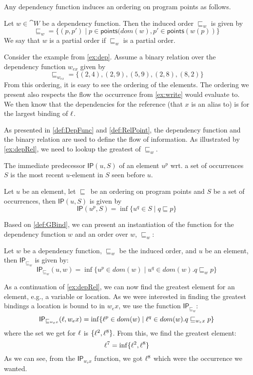 \documentclass{llncs}
\newcommand{\sqleq}{\ensuremath{\sqsubseteq\xspace}}
\newcommand{\points}{\ensuremath{\textsf{points}}}
\newcommand{\IP}{\ensuremath{\textsf{IP}}\xspace}
\begin{document}
Any dependency function induces an ordering on program points as follows.

\begin{definition}\label{def:RelPoint}
	Let $w\in\cat{W}$ be a dependency function.
	Then the induced order $\sqleq_w$ is given by
	 \[ \sqleq_w= \{(p,p')\mid p \in \points(dom(w), p' \in
           \points(w(p)) \} \]
         	We say that $w$ is a partial order if $\sqleq_w$ is a partial order.
\end{definition}

\begin{example}\label{ex:depRel}
	Consider the example from \cref{ex:dep}. Assume a binary
        relation over the dependency function $w_{ex}$ given by
	\[ \sqleq_{w_{ex}}=\{(2,4),(2,9),(5,9),(2,8),(8,2)\} \]
	From this ordering, it is easy to see the ordering of the elements.
	The ordering we present also respects the flow the occurrence from \cref{ex:write} would evaluate to.
	We then know that the dependencies for the reference (that $x$ is an alias to) is for the largest binding of $\ell$.
\end{example}

As presented in \cref{def:DepFunc} and \cref{def:RelPoint}, the
dependency function and the binary relation are used to define the
flow of information. As illustrated by \cref{ex:depRel}, we need to
lookup the greatest of $\sqleq_w$. 

The immediate predecessor $\IP(u,S)$ of an element $u^p$ wrt. a set of
occurrences $S$ is the most recent $u$-element in $S$ seen before $u$. 

\begin{definition}\label{def:GBind}
  Let $u$ be an element, let \sqleq\ be an ordering on program points
  and $S$ be a set of occurrences, then $\IP(u,S)$ is given by
\[ \IP(u^p,S)=\inf\{u^q\in S\mid q\sqleq p\} \]
\end{definition}

Based on \cref{def:GBind}, we can present an instantiation of the
function for the dependency function $w$ and an order over $w$,
$\sqleq_w$: 

\begin{definition}
  Let $w$ be a dependency function, $\sqleq_w$ be the induced order,
  and $u$ be an element, then $\IP_{\sqleq_w}$ is given by:
	$$\IP_{\sqleq_w}(u,w)=\inf\{u^p\in dom(w)\mid u^q\in dom(w).q\sqleq_w p\}$$
\end{definition}


\begin{example}\label{ex:deplookup}
  As a continuation of \cref{ex:depRel}, we can now find the greatest
  element for an element, e.g., a variable or location.  As we were
  interested in finding the greatest bindings a location is bound to
  in $w_ex$, we use the function $\IP_{\sqleq_w}$:
	\[ \IP_{\sqleq_{w_ex}}(\loc,w_ex)=\inf\{\loc^p\in dom(w)\mid
          \loc^q\in dom(w). q\sqleq_{w_ex} p\} \]
where the set we get for $\ell$ is 
$\{\ell^2,\ell^8\}$. From this, we find the greatest element: 
	\[ \ell^7=\inf\{\ell^2,\ell^8\} \]
	As we can see, from the $\IP_{w_ex}$ function, we got $\ell^8$ which were the occurrence we wanted.
\end{example}
\end{document}
